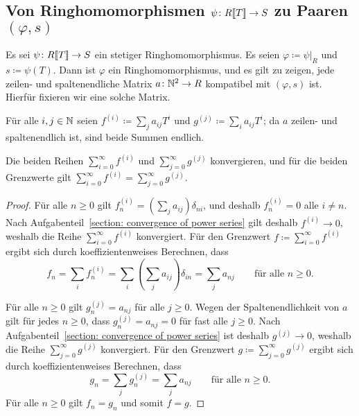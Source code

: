 \documentclass[a4paper, 10pt, numbers=noenddot]{scrartcl}
\begin{document}
\subsection*{Von Ringhomomorphismen $\psi \colon R[\![T]\!] \to S$ zu Paaren $(\varphi, s)$}

Es sei $\psi \colon R[\![T]\!] \to S$ ein stetiger Ringhomomorphismus.
Es seien $\varphi \coloneqq \psi|_R$ und $s \coloneqq \psi(T)$.
Dann ist $\varphi$ ein Ringhomomorphismus, und es gilt zu zeigen, jede zeilen- und spaltenendliche Matrix $a \colon \mathbb{N}^2 \to R$ kompatibel mit $(\varphi, s)$ ist.
Hierfür fixieren wir eine solche Matrix.

Für alle $i, j \in \mathbb{N}$ seien $f^{(i)} \coloneqq \sum_j a_{ij} T^i$ und $g^{(j)} \coloneqq \sum_i a_{ij} T^i$;
da $a$ zeilen- und spaltenendlich ist, sind beide Summen endlich.

\begin{claim}
  Die beiden Reihen $\sum_{i=0}^\infty f^{(i)}$ und $\sum_{j=0}^\infty g^{(j)}$ konvergieren, und für die beiden Grenzwerte gilt $\sum_{i=0}^\infty f^{(i)} = \sum_{j=0}^\infty g^{(j)}$.
\end{claim}

\begin{proof}
  Für alle $n \geq 0$ gilt $f^{(i)}_n = (\sum_j a_{ij}) \delta_{ni}$, und deshalb $f^{(i)}_n = 0$ alle $i \neq n$.
  Nach Aufgabenteil~\ref{section: convergence of power series} gilt deshalb $f^{(i)} \to 0$, weshalb die Reihe $\sum_{i=0}^\infty f^{(i)}$ konvergiert.
  Für den Grenzwert $f \coloneqq \sum_{i=0}^\infty f^{(i)}$ ergibt sich durch koeffizientenweises Berechnen, dass
  \[
    f_n
    = \sum_i f^{(i)}_n
    = \sum_i \left( \sum_j a_{ij} \right) \delta_{in}
    = \sum_j a_{nj}
    \qquad
    \text{für alle $n \geq 0$}.
  \]
  
  Für alle $n \geq 0$ gilt $g^{(j)}_n = a_{nj}$ für alle $j \geq 0$.
  Wegen der Spaltenendlichkeit von $a$ gilt für jedes $n \geq 0$, dass $g^{(j)}_n = a_{nj} = 0$ für fast alle $j \geq 0$.
  Nach Aufgabenteil~\ref{section: convergence of power series} ist deshalb $g^{(j)} \to 0$, weshalb die Reihe $\sum_{j=0}^\infty g^{(j)}$ konvergiert.
  Für den Grenzwert $g \coloneqq \sum_{j=0}^\infty g^{(j)}$ ergibt sich durch koeffizientenweises Berechnen, dass
  \[
    g_n = \sum_j g^{(j)}_n = \sum_j a_{nj}
    \qquad
    \text{für alle $n \geq 0$}.
  \]
  Für alle $n \geq 0$ gilt $f_n = g_n$ und somit $f = g$.
\end{proof}
\end{document}
